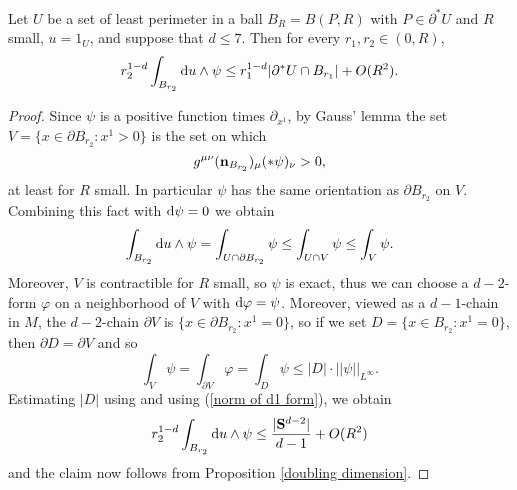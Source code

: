 \begin{proposition}\label{scalar curvature monotonicity}
Let $U$ be a set of least perimeter in a ball $B_R = B(P, R)$ with $P \in \partial^* U$ and $R$ small, $u = 1_U$, and suppose that $d \leq 7$.
Then for every $r_1, r_2 \in (0, R)$,
$$r_2^{1 - d}\int_{B_{r_2}} \mathop{}\!\mathrm{d} u \wedge \psi \leq r_1^{1 - d}|\partial^*U \cap B_{r_1}| + O(R^2).$$
\end{proposition}
\begin{proof}
Since $\psi$ is a positive function times $\partial_{x^1}$, by Gauss' lemma the set $V = \{x \in \partial B_{r_2}: x^1 > 0\}$ is the set on which
$$g^{\mu\nu} (\mathbf n_{B_{r_2}})_\mu (*\psi)_\nu > 0,$$
at least for $R$ small.
In particular $\psi$ has the same orientation as $\partial B_{r_2}$ on $V$. Combining this fact with $\mathop{}\!\mathrm{d} \psi = 0$ we obtain
$$\int_{B_{r_2}} \mathop{}\!\mathrm{d} u \wedge \psi = \int_{U \cap \partial B_{r_2}} \psi \leq \int_{U \cap V} \psi \leq \int_V \psi.$$
Moreover, $V$ is contractible for $R$ small, so $\psi$ is exact, thus we can choose a $d-2$-form $\varphi$ on a neighborhood of $V$ with $\mathop{}\!\mathrm{d} \varphi = \psi$.
Moreover, viewed as a $d-1$-chain in $M$, the $d-2$-chain $\partial V$ is $\{x \in \partial B_{r_2}: x^1 = 0\}$, so if we set $D = \{x \in B_{r_2}: x^1 = 0\}$, then $\partial D = \partial V$ and so
$$\int_V \psi = \int_{\partial V} \varphi = \int_D \psi \leq |D| \cdot ||\psi||_{L^\infty}.$$
Estimating $|D|$ using \cite{gray1974volume} and using (\ref{norm of d1 form}), we obtain
$$r_2^{1 - d} \int_{B_{r_2}} \mathop{}\!\mathrm{d} u \wedge \psi \leq \frac{|\mathbf S^{d - 2}|}{d - 1} + O(R^2)$$
and the claim now follows from Proposition \ref{doubling dimension}.
\end{proof}

